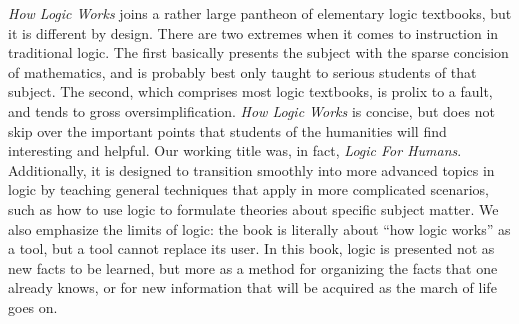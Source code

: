 \documentclass[12pt]{article}
\begin{document}
\thispagestyle{empty}

\noindent \emph{How Logic Works} joins a rather large pantheon of
elementary logic textbooks, but it is different by design. There are
two extremes when it comes to instruction in traditional logic. The
first basically presents the subject with the sparse concision of
mathematics, and is probably best only taught to serious students of
that subject. The second, which comprises most logic textbooks, is
prolix to a fault, and tends to gross oversimplification.  \emph{How
  Logic Works} is concise, but does not skip over the important points
that students of the humanities will find interesting and helpful. Our
working title was, in fact, \emph{Logic For Humans}.  Additionally, it
is designed to transition smoothly into more advanced topics in logic
by teaching general techniques that apply in more complicated
scenarios, such as how to use logic to formulate theories about
specific subject matter.  We also emphasize the limits of logic: the
book is literally about ``how logic works'' as a tool, but a tool
cannot replace its user.  In this book, logic is presented not as new
facts to be learned, but more as a method for organizing the facts
that one already knows, or for new information that will be acquired
as the march of life goes on.
\end{document}

